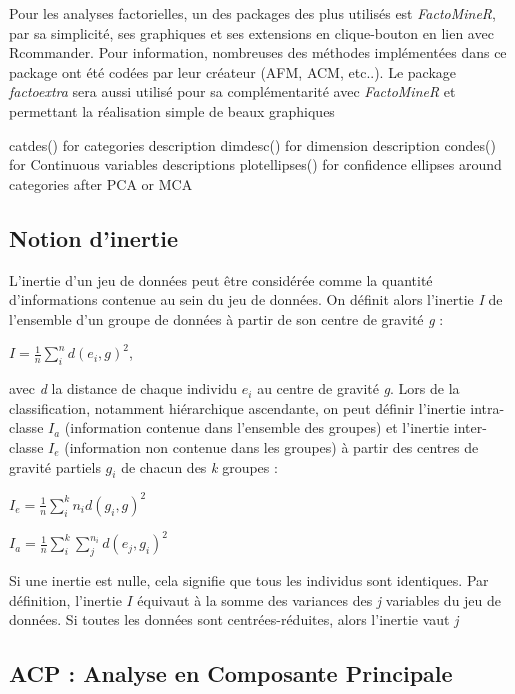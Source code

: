 \documentclass[
]{article}
\begin{document}
Pour les analyses factorielles, un des packages des plus utilisés est
\emph{FactoMineR}, par sa simplicité, ses graphiques et ses extensions
en clique-bouton en lien avec Rcommander. Pour information, nombreuses
des méthodes implémentées dans ce package ont été codées par leur
créateur (AFM, ACM, etc..). Le package \emph{factoextra} sera aussi
utilisé pour sa complémentarité avec \emph{FactoMineR} et permettant la
réalisation simple de beaux graphiques

catdes() for categories description dimdesc() for dimension description
condes() for Continuous variables descriptions plotellipses() for
confidence ellipses around categories after PCA or MCA

\hypertarget{notion-dinertie}{%
\subsection{Notion d'inertie}\label{notion-dinertie}}

L'inertie d'un jeu de données peut être considérée comme la quantité
d'informations contenue au sein du jeu de données. On définit alors
l'inertie \emph{I} de l'ensemble d'un groupe de données à partir de son
centre de gravité \emph{g} :

\begin{center}
$I=\frac{1}{n}\sum_i^nd(e_i,g)^2$,
\end{center}

avec \emph{d} la distance de chaque individu \(e_i\) au centre de
gravité \emph{g}. Lors de la classification, notamment hiérarchique
ascendante, on peut définir l'inertie intra-classe \(I_a\) (information
contenue dans l'ensemble des groupes) et l'inertie inter-classe \(I_e\)
(information non contenue dans les groupes) à partir des centres de
gravité partiels \(g_i\) de chacun des \emph{k} groupes :

\begin{center}

$I_e=\frac{1}{n}\sum_i^kn_id(g_i,g)^2$

$I_a=\frac{1}{n}\sum_i^k\sum_j^{n_i}d(e_j,g_i)^2$

\end{center}

Si une inertie est nulle, cela signifie que tous les individus sont
identiques. Par définition, l'inertie \(I\) équivaut à la somme des
variances des \emph{j} variables du jeu de données. Si toutes les
données sont centrées-réduites, alors l'inertie vaut \emph{j}

\hypertarget{acp-analyse-en-composante-principale}{%
\subsection{ACP : Analyse en Composante
Principale}\label{acp-analyse-en-composante-principale}}
\end{document}
